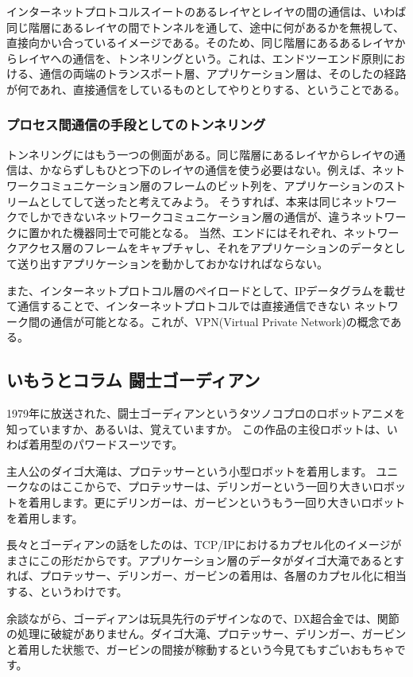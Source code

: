 インターネットプロトコルスイートのあるレイヤとレイヤの間の通信は、いわば同じ階層にあるレイヤの間でトンネルを通して、途中に何があるかを無視して、直接向かい合っているイメージである。そのため、同じ階層にあるあるレイヤからレイヤへの通信を、トンネリングという。これは、エンドツーエンド原則における、通信の両端のトランスポート層、アプリケーション層は、そのしたの経路が何であれ、直接通信をしているものとしてやりとりする、ということである。


\subsubsection{プロセス間通信の手段としてのトンネリング}

トンネリングにはもう一つの側面がある。同じ階層にあるレイヤからレイヤの通信は、かならずしもひとつ下のレイヤの通信を使う必要はない。例えば、ネットワークコミュニケーション層のフレームのビット列を、アプリケーションのストリームとしてして送ったと考えてみよう。
そうすれば、本来は同じネットワークでしかできないネットワークコミュニケーション層の通信が、違うネットワークに置かれた機器同士で可能となる。
当然、エンドにはそれぞれ、ネットワークアクセス層のフレームをキャプチャし、それをアプリケーションのデータとして送り出すアプリケーションを動かしておかなければならない。

また、インターネットプロトコル層のペイロードとして、IPデータグラムを載せて通信することで、インターネットプロトコルでは直接通信できない
ネットワーク間の通信が可能となる。これが、VPN(Virtual Private Network)の概念である。
\subsection*{いもうとコラム 闘士ゴーディアン}
1979年に放送された、闘士ゴーディアンというタツノコプロのロボットアニメを知っていますか、あるいは、覚えていますか。
この作品の主役ロボットは、いわば着用型のパワードスーツです。

主人公のダイゴ大滝は、プロテッサーという小型ロボットを着用します。
ユニークなのはここからで、プロテッサーは、デリンガーという一回り大きいロボットを着用します。更にデリンガーは、ガービンというもう一回り大きいロボットを着用します。

長々とゴーディアンの話をしたのは、TCP/IPにおけるカプセル化のイメージがまさにこの形だからです。アプリケーション層のデータがダイゴ大滝であるとすれば、プロテッサー、デリンガー、ガービンの着用は、各層のカプセル化に相当する、というわけです。

余談ながら、ゴーディアンは玩具先行のデザインなので、DX超合金では、関節の処理に破綻がありません。ダイゴ大滝、プロテッサー、デリンガー、ガービンと着用した状態で、ガービンの間接が稼動するという今見てもすごいおもちゃです。


